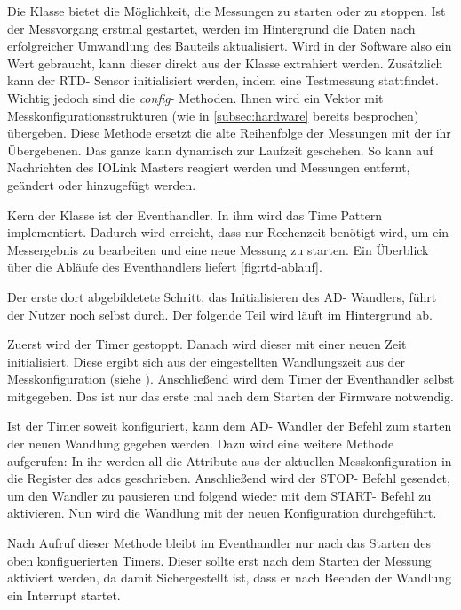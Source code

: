 Die Klasse bietet die Möglichkeit, die Messungen zu starten oder zu stoppen.
Ist der Messvorgang erstmal gestartet, werden im Hintergrund die Daten nach erfolgreicher Umwandlung des Bauteils aktualisiert.
Wird in der Software also ein Wert gebraucht, kann dieser direkt aus der Klasse extrahiert werden.\newline
Zusätzlich kann der RTD- Sensor initialisiert werden, indem eine Testmessung stattfindet.
Wichtig jedoch sind die \textit{config}- Methoden.
Ihnen wird ein Vektor mit Messkonfigurationsstrukturen (wie in \autoref{subsec:hardware} bereits besprochen) übergeben.
Diese Methode ersetzt die alte Reihenfolge der Messungen mit der ihr Übergebenen.
Das ganze kann dynamisch zur Laufzeit geschehen.
So kann auf Nachrichten des IOLink Masters reagiert werden und Messungen entfernt, geändert oder hinzugefügt werden.

Kern der Klasse ist der Eventhandler. In ihm wird das Time Pattern implementiert.
Dadurch wird erreicht, dass nur Rechenzeit benötigt wird, um ein Messergebnis zu bearbeiten und eine neue Messung zu starten.
Ein Überblick über die Abläufe des Eventhandlers liefert \autoref{fig:rtd-ablauf}.

Der erste dort abgebildetete Schritt, das Initialisieren des AD- Wandlers, führt der Nutzer noch selbst durch.
Der folgende Teil wird läuft im Hintergrund ab.

Zuerst wird der Timer gestoppt.
Danach wird dieser mit einer neuen Zeit initialisiert.
Diese ergibt sich aus der eingestellten Wandlungszeit aus der Messkonfiguration (siehe \textcite[][42]{TexasInstruments.2016}).\newline
Anschließend wird dem Timer der Eventhandler selbst mitgegeben.
Das ist nur das erste mal nach dem Starten der Firmware notwendig.

Ist der Timer soweit konfiguriert, kann dem AD- Wandler der Befehl zum starten der neuen Wandlung gegeben werden.
Dazu wird eine weitere Methode aufgerufen: In ihr werden all die Attribute aus der aktuellen Messkonfiguration in die Register des \ac{adc}s geschrieben.\newline
Anschließend wird der STOP- Befehl gesendet, um den Wandler zu pausieren und folgend wieder mit dem START- Befehl zu aktivieren.
Nun wird die Wandlung mit der neuen Konfiguration durchgeführt.

Nach Aufruf dieser Methode bleibt im Eventhandler nur nach das Starten des oben konfiguerierten Timers.
Dieser sollte erst nach dem Starten der Messung aktiviert werden, da damit Sichergestellt ist, dass er nach Beenden der Wandlung ein Interrupt startet.

